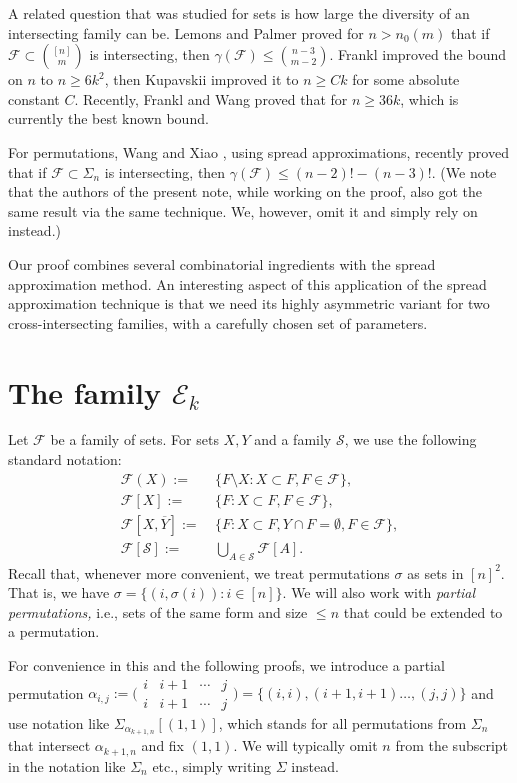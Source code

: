 \documentclass[11pt]{extarticle}
\numberwithin{equation}{section} %
\theoremstyle{plain}
\theoremstyle{definition}
\newcommand{\FF}{\mathcal{F}}
\newcommand{\m}{\mathcal}
\begin{document}
A related question that was studied for sets is  how large the diversity of an intersecting family can be. Lemons and Palmer \cite{LP} proved for $n>n_0(m)$ that if $\FF \subset {[n] \choose m}$ is intersecting, then $\gamma(\FF)\leq{n-3 \choose m-2}$. Frankl \cite{FAN} improved the bound on $n$ to $n \geq 6k^2$, then Kupavskii \cite{KD} improved it to $n \geq Ck$ for some absolute constant $C$.  Recently, Frankl and Wang \cite{FWD} proved that  for $n \geq 36k$, which is currently the best known bound. 

For permutations, Wang and Xiao \cite{WX}, using spread approximations, recently proved that if $\FF \subset \Sigma_n$ is intersecting, then $\gamma(\FF) \leq (n-2)!-(n-3)!.$ (We note that the authors of the present note, while working on the proof, also got the same result via the same technique. We, however, omit it and simply rely on \cite{WX} instead.)

Our proof combines several combinatorial ingredients with the spread approximation method. An interesting aspect of this application of the spread approximation technique is that we need its highly asymmetric variant for two cross-intersecting families, with a carefully chosen set of parameters. 

\section{The family $\m E_k$} \label{sec2}
Let $\FF$ be a family of sets. For sets $X, Y$ and a family $\m S$, we use the following standard notation:
\begin{align*}
\FF(X):=&\ \{F\setminus X:X\subset F, F\in \FF\},\\
\FF[X]:=&\ \{F: X\subset F, F\in \FF\},\\
\FF[X, \overline{Y}]:=&\ \{F: X\subset F, Y \cap F = \emptyset,  F\in \FF\} ,\\
\FF[\m{S}]:=&\ \bigcup_{A\in \m{S}}\FF[A].
\end{align*}
Recall that, whenever more convenient, we treat permutations $\sigma$ as sets in $[n]^2$. That is, we have $\sigma = \{(i,\sigma(i)): i\in[n]\}$. We will also work with {\it partial permutations,} i.e., sets of the same form and size $\le n$ that could be extended to a permutation. 

For convenience in this and the  following proofs,  we introduce a partial permutation $\alpha_{i,j} := \bigl(\begin{smallmatrix}
  i & i+1 &  \cdots &  j \\
  i & i+1 &  \cdots &  j
\end{smallmatrix}\bigr)=\{ (i,i),(i+1,i+1) \dots,(j,j) \}$  and use notation like $\Sigma_{\alpha_{k+1,n}}[(1,1)]$, which stands for all permutations from $\Sigma_n$ that intersect $\alpha_{k+1,n}$ and fix $(1,1).$ We will typically omit $n$   from the subscript in the notation like $\Sigma_n$ etc.,  simply writing $\Sigma$ instead. 
\end{document}
